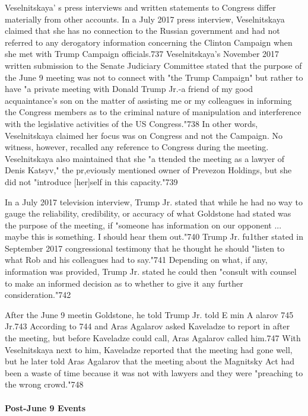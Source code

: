 Veselnitskaya' s press interviews and written statements to Congress differ materially from other accounts. In a July 2017 press interview, Veselnitskaya claimed that she has no connection to the Russian government and had not referred to any derogatory information concerning the Clinton Campaign when she met with Trump Campaign officials.737 Veselnitskaya's November 2017 written submission to the Senate Judiciary Committee stated that the purpose of the June 9 meeting was not to connect with "the Trump Campaign" but rather to have "a private meeting with Donald Trump Jr.-a friend of my good acquaintance's son on the matter of assisting me or my colleagues in informing the Congress members as to the criminal nature of manipulation and interference with the legislative activities of the US Congress."738 In other words, Veselnitskaya claimed her focus was on Congress and not the Campaign. No witness,  however,  recalled any reference to Congress during the meeting. Veselnitskaya also maintained that she "a ttended the meeting as a lawyer of Denis Katsyv," the pr,eviously mentioned owner of Prevezon Holdings, but she did not "introduce [her]self in this capacity."739

In a July 2017 television interview, Trump Jr. stated that while he had no way to gauge the reliability, credibility, or accuracy of what Goldstone had stated was the purpose of the meeting, if  "someone has information on our opponent ... maybe this is something. I  should hear them out."740 Trump Jr. fu1ther stated in September 2017 congressional testimony that he thought he should "listen to what Rob and his colleagues had to say."741 Depending on what, if any, information was provided,  Trump Jr. stated he could then "consult with counsel to make an informed decision as to whether to give it any further consideration."742

After the June 9  meetin Goldstone, he told Trump Jr. told E min A alarov 745 Jr.743 According to 744 and Aras Agalarov asked Kaveladze to report in after the meeting,  but before Kaveladze could call,  Aras Agalarov called him.747 With Veselnitskaya next to him,  Kaveladze reported that the meeting had gone well, but he later told Aras Agalarov that the meeting about the Magnitsky Act had been a waste of time because it  was not with lawyers and they were "preaching to the wrong crowd."748

\paragraph{Post-June 9 Events}


